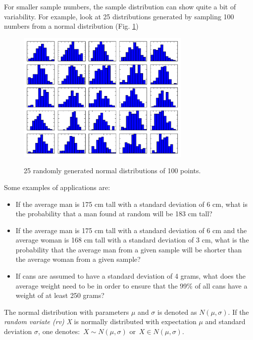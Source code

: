 For smaller sample numbers, the sample distribution can show quite a bit of variability. For example, look at 25 distributions generated by sampling 100 numbers from a normal distribution (Fig. \ref{fig:MultipleNormal})

\begin{figure}
  \centering
  \includegraphics[width=0.75\textwidth]{../Images/Normal_MultHist.png}\\
  \caption{25 randomly generated normal distributions of 100 points.}\label{fig:MultipleNormal}
\end{figure}

Some examples of applications are:

\begin{itemize}
    \item{}If the average man is 175 cm tall with a standard deviation of 6 cm, what is the probability that a man found at random will be 183 cm tall?
    \item{}If the average man is 175 cm tall with a standard deviation of 6 cm and the average woman is 168 cm tall with a standard deviation of 3 cm, what is the probability that the average man from a given sample will be shorter than the average woman from a given sample?
    \item{}If cans are assumed to have a standard deviation of 4 grams, what does the average weight need to be in order to ensure that the 99\% of all cans have a weight of at least 250 grams?
\end{itemize}

The normal distribution with parameters $\mu$ and $\sigma$ is denoted as {$N(\mu,\sigma)$}. If the \emph{random variate (rv)} {\itshape X} is normally distributed with expectation $\mu$ and standard deviation $\sigma$, one denotes: {$\,X \sim N(\mu,\sigma)$} or $\,X \in N(\mu,\sigma)$.

